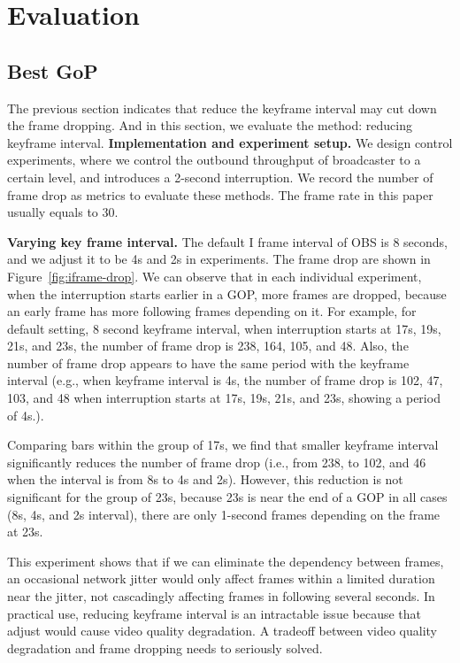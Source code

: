 \section{Evaluation}

\subsection{Best GoP}
The previous section indicates that reduce the keyframe interval may cut down the frame dropping. And in this section, we evaluate the method: reducing keyframe interval.
\textbf{Implementation and experiment setup.}
We design control experiments, where we control the outbound throughput of broadcaster to a certain level, and introduces a 2-second interruption. We record the number of frame drop as metrics to evaluate these methods. The frame rate in this paper usually equals to 30.


\textbf{Varying key frame interval.} The default I frame interval of OBS is 8 seconds, and we adjust it to be 4s and 2s in experiments. The frame drop are shown in Figure~\ref{fig:iframe-drop}. We can observe that in each individual experiment, when the interruption starts earlier in a GOP, more frames are dropped, because an early frame has more following frames depending on it. For example, for default setting, 8 second keyframe interval, when interruption starts at 17s, 19s, 21s, and 23s, the number of frame drop is 238, 164, 105, and 48.
Also, the number of frame drop appears to have the same period with the keyframe interval (e.g., when keyframe interval is 4s, the number of frame drop is 102, 47, 103, and 48 when interruption starts at 17s, 19s, 21s, and 23s, showing a period of 4s.).

Comparing bars within the group of 17s, we find that smaller keyframe interval significantly reduces the number of frame drop (i.e., from 238, to 102, and 46 when the interval is from 8s to 4s and 2s). However, this reduction is not significant for the group of 23s, because 23s is near the end of a GOP in all cases (8s, 4s, and 2s interval), there are only 1-second frames depending on the frame at 23s.

This experiment shows that if we can eliminate the dependency between frames, an occasional network jitter would only affect frames within a limited duration near the jitter, not cascadingly affecting frames in following several seconds. In practical use, reducing keyframe interval is an intractable issue because that adjust would cause video quality degradation. A tradeoff between video quality degradation and frame dropping needs to seriously solved.

